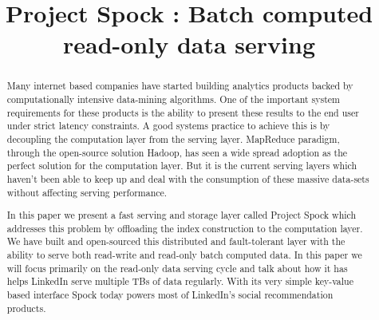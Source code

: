 \documentclass[10pt,twocolumn,preprint,nonatbib,numbers]{sigplanconf}
\begin{document}
\copyrightdata{[to be supplied]} 

\newcommand{\projectname}{Spock}


\title{Project \projectname{} : Batch computed read-only data serving}

\authorinfo{}
           {}
           {}
\maketitle

\begin{abstract}
Many internet based companies have started building analytics products backed by computationally intensive data-mining algorithms. One of the important system requirements for these products is the ability to present these results to the end user under strict latency constraints. A good systems practice to achieve this is by decoupling the computation layer from the serving layer. MapReduce paradigm, through the open-source solution Hadoop, has seen a wide spread adoption as the perfect solution for the computation layer. But it is the current serving layers which haven't been able to keep up and deal with the consumption of these massive data-sets without affecting serving performance. 

In this paper we present a fast serving and storage layer called Project \projectname{} which addresses this problem by offloading the index construction to the computation layer. We have built and open-sourced this distributed and fault-tolerant layer with the ability to serve both read-write and read-only batch computed data. In this paper we will focus primarily on the read-only data serving cycle and talk about how it has helps LinkedIn serve multiple TBs of data regularly. With its very simple key-value based interface \projectname{} today powers most of LinkedIn's social recommendation products. 
\end{abstract}

\end{document}
